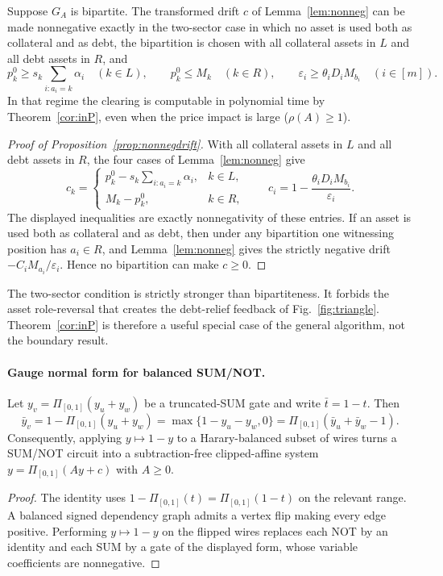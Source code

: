 \documentclass{llncs}
\newcommand{\clip}{\Pi}
\newcommand{\GA}{G_A}
\newcommand{\eps}{\varepsilon}
\begin{document}
\begin{proposition}
\label{prop:nonnegdrift}
Suppose \(\GA\) is bipartite. The transformed drift \(c\) of Lemma~\ref{lem:nonneg} can be made nonnegative exactly in the two-sector case in which no asset is used both as collateral and as debt, the bipartition is chosen with all collateral assets in \(L\) and all debt assets in \(R\), and
\[
 p^0_k\ge s_k\sum_{i:a_i=k}\alpha_i\quad(k\in L),\qquad
 p^0_k\le M_k\quad(k\in R),\qquad
 \eps_i\ge\theta_iD_iM_{b_i}\quad(i\in[m]).
\]
In that regime the clearing is computable in polynomial time by Theorem~\ref{cor:inP}, even when the price impact is large (\(\rho(A)\ge1\)).
\end{proposition}
\begin{proof}[Proof of Proposition~\ref{prop:nonnegdrift}]
With all collateral assets in \(L\) and all debt assets in \(R\), the four cases of Lemma~\ref{lem:nonneg} give
\[
c_k=\begin{cases}p^0_k-s_k\sum_{i:a_i=k}\alpha_i,&k\in L,\\ M_k-p^0_k,&k\in R,\end{cases}
\qquad
c_i=1-\frac{\theta_iD_iM_{b_i}}{\eps_i}.
\]
The displayed inequalities are exactly nonnegativity of these entries. If an asset is used both as collateral and as debt, then under any bipartition one witnessing position has \(a_i\in R\), and Lemma~\ref{lem:nonneg} gives the strictly negative drift \(-C_iM_{a_i}/\eps_i\). Hence no bipartition can make \(c\ge0\).
\end{proof}

\begin{remark}
The two-sector condition is strictly stronger than bipartiteness. It forbids the asset role-reversal that creates the debt-relief feedback of Fig.~\ref{fig:triangle}. Theorem~\ref{cor:inP} is therefore a useful special case of the general algorithm, not the boundary result.
\end{remark}

\paragraph{Gauge normal form for balanced SUM/NOT.}
\begin{lemma}
\label{lem:gauge}
Let \(y_v=\clip_{[0,1]}(y_u+y_w)\) be a truncated-SUM gate and write \(\bar t=1-t\). Then
\[
 \bar y_v
 =1-\clip_{[0,1]}(y_u+y_w)
 =\max\{1-y_u-y_w,0\}
 =\clip_{[0,1]}(\bar y_u+\bar y_w-1).
\]
Consequently, applying \(y\mapsto 1-y\) to a Harary-balanced subset of wires turns a SUM/NOT circuit into a subtraction-free clipped-affine system \(y=\clip_{[0,1]}(Ay+c)\) with \(A\ge0\).
\end{lemma}
\begin{proof}
The identity uses \(1-\clip_{[0,1]}(t)=\clip_{[0,1]}(1-t)\) on the relevant range. A balanced signed dependency graph admits a vertex flip making every edge positive. Performing \(y\mapsto1-y\) on the flipped wires replaces each NOT by an identity and each SUM by a gate of the displayed form, whose variable coefficients are nonnegative.
\end{proof}
\end{document}
